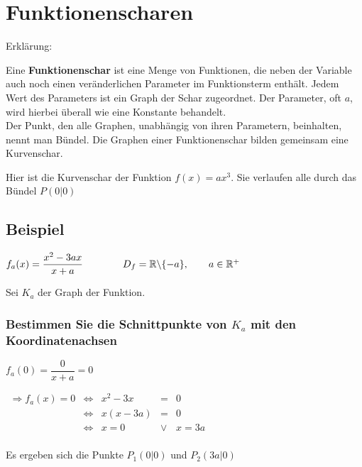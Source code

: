 \documentclass[main.tex]{subfiles}
\begin{document}
\section{Funktionenscharen}

Erklärung:

\begin{minipage}[b]{0.5\linewidth}
	Eine \textbf{Funktionenschar} ist eine Menge von Funktionen, die neben der Variable auch noch einen veränderlichen Parameter im Funktionsterm enthält. Jedem Wert des Parameters ist ein Graph der Schar zugeordnet. Der Parameter, oft $a$, wird hierbei überall wie eine Konstante behandelt.\\
	Der Punkt, den alle Graphen, unabhängig von ihren Parametern, beinhalten, nennt man Bündel. Die Graphen einer
	Funktionenschar bilden gemeinsam eine Kurvenschar.

	Hier ist die Kurvenschar der Funktion $f(x)=ax^3$. Sie verlaufen alle durch das Bündel $P(0|0)$
\end{minipage}
\hfill
\begin{minipage}[b]{0.4\linewidth}
\end{minipage}

\subsection{Beispiel}

$f_{a}(x)= \dfrac{x^2-3ax}{x+a} \qquad \qquad D_{f} = \mathbb{R} \backslash \{ -a \}, \qquad a \in \mathbb{R}^+$

Sei $K_{a}$ der Graph der Funktion.


\subsubsection{Bestimmen Sie die Schnittpunkte von $K_{a}$ mit den Koordinatenachsen}

$f_{a}(0)=\dfrac{0}{x+a} = 0$

$\begin{array}{rcccl}
	\Rightarrow f_{a}(x)=0 & \Leftrightarrow & x^2-3x & = & 0 \\
	&\Leftrightarrow & x(x-3a) & = & 0 \\
	&\Leftrightarrow & x=0 & \lor & x  =  3a  \\
\end{array}$

Es ergeben sich die Punkte $P_{1}(0|0)$ und $P_{2}(3a|0)$
\end{document}

